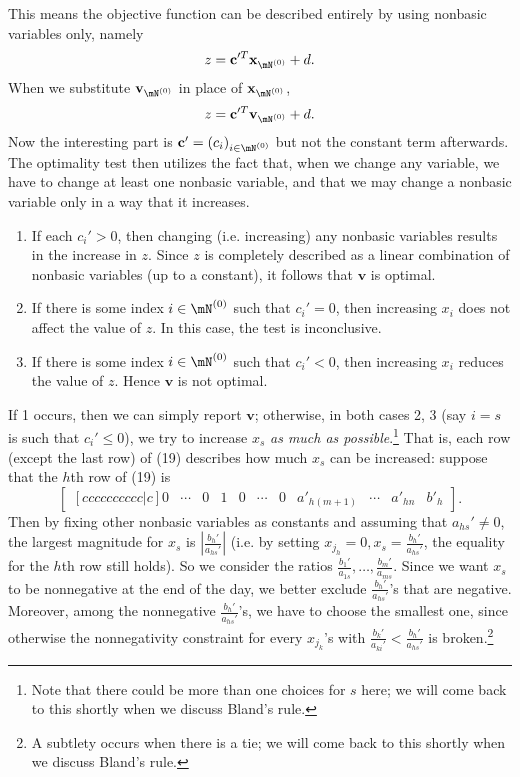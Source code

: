 \documentclass{article}
\renewcommand{\vec}{\mathbf}
\begin{document}
This means the objective function can be described entirely by using nonbasic variables only, namely
\begin{equation*}
    z=\vec{c}'^{T} \vec{x}_{\mN^{\left( 0 \right) }}+d.
\end{equation*}
When we substitute $\vec{v}_{\mN^{\left( 0 \right) }}$ in place of $\vec{x}_{\mN^{\left( 0 \right) }}$, 
\begin{equation*}
    z = \vec{c}'^{T} \vec{v}_{\mN^{\left( 0 \right) }}+d.
\end{equation*}
Now the interesting part is $\vec{c}' = \left( c_i \right)_{i\in\mN^{\left( 0 \right) }} $ but not the constant term afterwards. The optimality test then utilizes the fact that, when we change any variable, we have to change at least one nonbasic variable, and that we may change a nonbasic variable only in a way that it increases.
\begin{enumerate}
    \item If each $c_i'>0$, then changing (i.e. increasing) any nonbasic variables results in the increase in $z$. Since $z$ is completely described as a linear combination of nonbasic variables (up to a constant), it follows that $\vec{v}$ is optimal.
    \item If there is some index $i\in\mN^{\left( 0 \right) }$ such that $c_i'=0$, then increasing $x_i$ does not affect the value of $z$. In this case, the test is inconclusive.
    \item If there is some index $i\in\mN^{\left( 0 \right) }$ such that $c_i'<0$, then increasing $x_i$ reduces the value of $z$. Hence $\vec{v}$ is not optimal.
\end{enumerate}
If 1 occurs, then we can simply report $\vec{v}$; otherwise, in both cases 2, 3 (say $i=s$ is such that $c_i'\leq 0$), we try to increase $x_s$ \textit{as much as possible}.\footnote{Note that there could be more than one choices for $s$ here; we will come back to this shortly when we discuss Bland's rule.} That is, each row (except the last row) of (19) describes how much $x_s$ can be increased: suppose that the $h$th row of (19) is
\begin{equation*}
    \begin{bmatrix}[cccccccccc|c] 0 & \cdots & 0 & 1 & 0 & \cdots & 0 & a'_{h\left( m+1 \right) } & \cdots & a'_{hn} & b'_h\end{bmatrix} .
\end{equation*}
Then by fixing other nonbasic variables as constants and assuming that $a_{hs}'\neq 0$, the largest magnitude for $x_s$ is $\left|\frac{b_h'}{a_{hs}'}\right|$ (i.e. by setting $x_{j_h}=0, x_s=\frac{b_h'}{a_{hs}'}$, the equality for the $h$th row still holds). So we consider the ratios $\frac{b_1'}{a_{1s}},\ldots,\frac{b_m'}{a_{ms}}$. Since we want $x_s$ to be nonnegative at the end of the day, we better exclude $\frac{b_h'}{a_{hs}'}$'s that are negative. Moreover, among the nonnegative $\frac{b_h'}{a_{hs}'}$'s, we have to choose the smallest one, since otherwise the nonnegativity constraint for every $x_{j_k}$'s with $\frac{b_k'}{a_{ki}'}<\frac{b_h'}{a_{hs}'}$ is broken.\footnote{A subtlety occurs when there is a tie; we will come back to this shortly when we discuss Bland's rule.}
\end{document}
